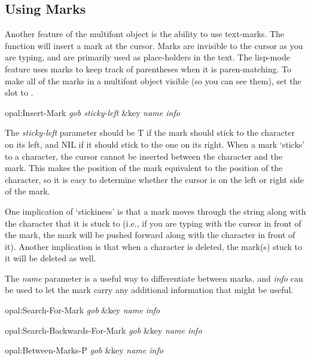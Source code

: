 \subsection{Using Marks}
\label{marks}

Another feature of the multifont object is the ability to use text-marks.  The
function  will insert a mark at the cursor.  Marks are
invisible to the cursor as you are typing, and are primarily used as
place-holders in the text.  The lisp-mode feature uses marks to keep
track of parentheses when it is paren-matching.  To make all of the
marks in a multifont object visible (so you can see them), set the
 slot to .

\begin{programexample}
opal:Insert-Mark {\it gob sticky-left} \&key {\it name info}\value{function}
\end{programexample}

The {\it sticky-left} parameter should be T if the mark should stick to
the character
on its left, and NIL if it should stick to the one on its right.  When
a mark `sticks' to a character, the cursor cannot be inserted between
the character and the mark.  This makes the position of the mark
equivalent to the position of the character, so it is easy to
determine whether the cursor is on the left or right side of the mark.

One implication of `stickiness' is that a mark moves through the
string along with the character that it is stuck to (i.e., if you are
typing with the cursor in front of the mark, the mark will be pushed forward
along with the character in front of it).  Another implication is
that when a character is deleted, the mark(s) stuck to it will be
deleted as well.

The {\it name} parameter is a useful way to differentiate between marks,
and {\it info} can be used to let the mark carry any additional
information that might be useful.

\begin{programexample}
opal:Search-For-Mark {\it gob} \&key {\it name info}\value{function}

opal:Search-Backwards-For-Mark {\it gob} \&key {\it name info}\value{function}

opal:Between-Marks-P {\it gob} \&key {\it name info}\value{function}
\end{programexample}

